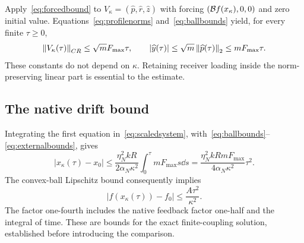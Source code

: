Apply~\eqref{eq:forcedbound} to
$V_\kappa=(\widehat p,\widehat r,\widehat z)$ with forcing
$(\mathcal B f(x_\kappa),0,0)$ and zero initial value. Equations~\eqref{eq:profilenorms} and~\eqref{eq:ballbounds} yield, for every finite $\tau\ge0$,
\begin{equation}\label{eq:externalbounds}
\left\|V_\kappa(\tau)\right\|_{CR}\le\sqrt mF_{\max}\tau,\qquad
|\widehat y(\tau)|\le\sqrt m\left\|\widehat p(\tau)\right\|_2
\le mF_{\max}\tau.
\end{equation}
These constants do not depend on $\kappa$. Retaining receiver loading inside the norm-preserving linear part is essential to the estimate.

\subsection{The native drift bound}\label{sec:drift}
Integrating the first equation in~\eqref{eq:scaledsystem}, with~\eqref{eq:ballbounds}--\eqref{eq:externalbounds}, gives
\begin{equation}\label{eq:coredrift}
|x_\kappa(\tau)-x_0|
\le\frac{\eta_N^2kR}{2\alpha_N\kappa^2}
\int_0^\tau mF_{\max}s\dd s
=\frac{\eta_N^2kRmF_{\max}}{4\alpha_N\kappa^2}\tau^2.
\end{equation}
The convex-ball Lipschitz bound consequently implies
\begin{equation}\label{eq:drivedrift}
|f(x_\kappa(\tau))-f_0|\le\frac{A\tau^2}{\kappa^2}.
\end{equation}
The factor one-fourth includes the native feedback factor one-half and the integral of time. These are bounds for the exact finite-coupling solution, established before introducing the comparison.
